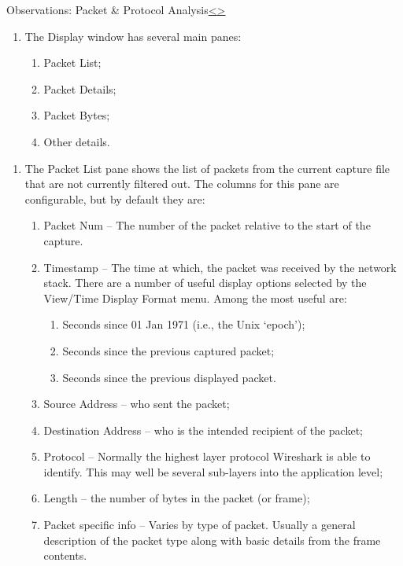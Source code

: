 \documentclass[12pt]{extarticle}
\newenvironment{instructionblock}{\Large\bgroup}{\egroup}
\newcommand{\ben}{\begin{enumerate}}
\newcommand{\een}{\end{enumerate}}
\begin{document}
	
	\pagebreak
	\begin{slide}{Observations: Packet \& Protocol Analysis}{\hyperref[slide 13]{\textless}\hyperref[slide 15]{\textgreater}}
		\begin{instructionblock}
			\begin{enumerate}
			\item The Display window has several main panes:
			\ben
				\item Packet List; 
				\item Packet Details; 
				\item Packet Bytes;
				\item Other details. 
			\een
			\end{enumerate}
		\end{instructionblock}
	\end{slide}
	\begin{enumerate}
		\item The Packet List pane shows the list of packets from the current capture file that are not currently filtered out.  The columns for this pane are configurable, but by default they are:
		\ben
			\item Packet Num -- The number of the packet relative to the start of the capture.
			
			\item Timestamp -- The time at which, the packet was received by the network stack.  There are a number of useful display options selected by the View/Time Display Format menu.  Among the most useful are:
			\ben
				\item Seconds since 01 Jan 1971 (i.e., the Unix `epoch');
				
				\item Seconds since the previous captured packet;
				
				\item Seconds since the previous displayed packet.
			\een
			\item Source Address -- who sent the packet;
			
			\item Destination Address -- who is the intended recipient of the packet;
			
			\item Protocol -- Normally the highest layer protocol Wireshark is able to identify.  This may well be several sub-layers into the application level;
			
			\item Length -- the number of bytes in the packet (or frame);
			
			\item Packet specific info -- Varies by type of packet.  Usually a general description of the packet type along with basic details from the frame contents.
		\een
	\end{enumerate}
	
\end{document}
